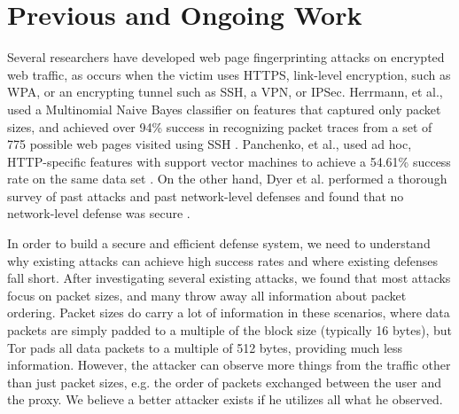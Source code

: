 \documentclass[11pt,oneside]{article}
\begin{document}
\section{Previous and Ongoing Work}

Several researchers have developed web page fingerprinting attacks on encrypted
web traffic, as occurs when the victim uses HTTPS, link-level encryption, such
as WPA, or an encrypting tunnel such as SSH, a VPN, or IPSec. Herrmann, et al.,
   used a Multinomial Naive Bayes classifier on features that captured only
   packet sizes, and achieved over 94\% success in recognizing packet traces
   from a set of 775 possible web pages visited using SSH
   \cite{herrmann-ccsw09}. Panchenko, et al., used ad hoc, HTTP-specific
   features with support vector machines to achieve a 54.61\% success rate on
   the same data set \cite{panchenko-wpes11}. On the other hand, Dyer et al.
   performed a thorough survey of past attacks and past network-level defenses
   and found that no network-level defense was secure \cite{dyer-snp12}. 

In order to build a secure and efficient defense system, we need to understand
why existing attacks can achieve high success rates and where existing defenses
fall short. After investigating several existing attacks, we found that most attacks
focus on packet sizes, and many throw away all information about packet
ordering. Packet sizes do carry a lot of information in these scenarios, where
data packets are simply padded to a multiple of the block size (typically 16
		bytes), but Tor pads all data packets to a multiple of 512 bytes,
	 providing much less information. However, the attacker can observe more
	 things from the traffic other than just packet sizes, e.g. the order of
	 packets exchanged between the user and the proxy. We believe a better
	 attacker exists if he utilizes all what he observed.
\end{document}
